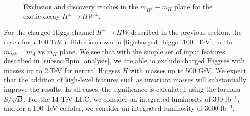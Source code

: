 {\begin{figure}
    
  \caption{Exclusion and discovery reaches in the $m_{H^\pm}-m_{H}$ plane for the exotic decay $H^\pm\rightarrow HW^\pm$.}
\label{fig:charged_higgs_100_TeV}
\end{figure}

For the charged Higgs channel $H^\pm\rightarrow HW$ described in the previous section, the reach for a 100 TeV collider is shown in \autoref{fig:charged_higgs_100_TeV}, in the $m_{H^\pm} = m_A$ vs $m_H$ plane. We see that with the simple set of input features described in \autoref{subsec:Hpm_analysis}, we are able to exclude charged Higgses with masses up to 2 TeV for neutral Higgses \emph{H} with masses up to 500 GeV. We expect that the addition of high-level features such as invariant masses will substantially improve the results. In all cases, the significance is calculated using the formula $S/\sqrt{B}$. For the 14 TeV LHC, we consider an integrated luminosity of 300 fb$^{-1}$, and for a 100 TeV collider, we consider an integrated luminosity of 3000 fb$^{-1}$.


}
